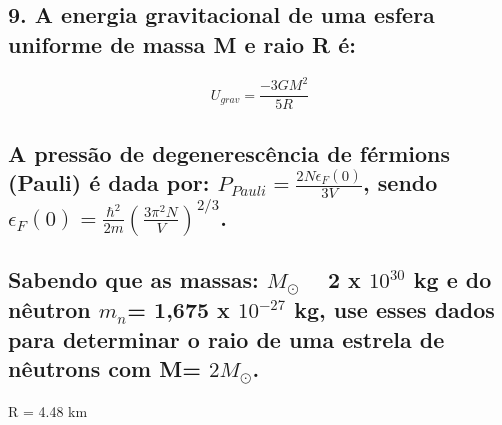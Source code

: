 \documentclass{article}
\begin{document}
\subsection*{9. A energia gravitacional de uma esfera uniforme de massa M e raio R é:}
\[U_{grav} = \frac{-3 GM^2}{5 R}\]
\subsection*{A pressão de degenerescência de férmions (Pauli) é dada por: $P_{Pauli} = \frac{2 N \epsilon_F(0)}{3 V}$, sendo $\epsilon_F(0) = \frac{\hbar^2}{2 m} \left(\frac{3 \pi^2 N}{V}\right)^{2/3}$.}

\subsection*{Sabendo que as massas: $M_{\odot}$ ~ 2 x $10^{30}$ kg e do nêutron $m_n$= 1,675 x $10^{-27}$ kg, use esses dados para determinar o raio de uma estrela de nêutrons com M= $2M_{\odot}$.}

R = 4.48 km
\end{document}
